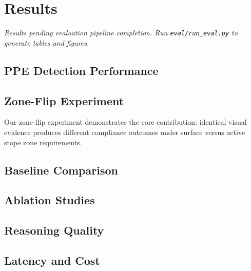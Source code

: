 \section{Results}
\label{sec:results}

\textit{Results pending evaluation pipeline completion. Run \texttt{eval/run\_eval.py} to generate tables and figures.}

\subsection{PPE Detection Performance}


\subsection{Zone-Flip Experiment}


Our zone-flip experiment demonstrates the core contribution: identical visual evidence produces different compliance outcomes under surface versus active stope zone requirements.

\subsection{Baseline Comparison}


\subsection{Ablation Studies}


\subsection{Reasoning Quality}


\subsection{Latency and Cost}


